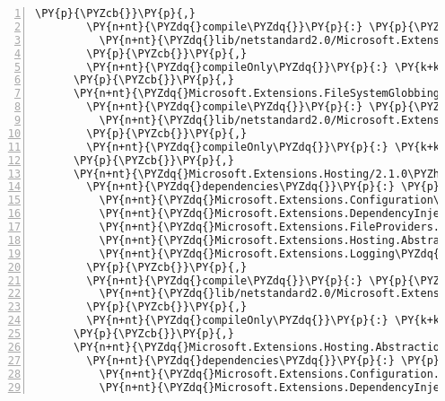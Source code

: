 \begin{Verbatim}[commandchars=\\\{\},numbers=left,firstnumber=1,stepnumber=1,numberblanklines=0]
        \PY{p}{\PYZcb{}}\PY{p}{,}
        \PY{n+nt}{\PYZdq{}compile\PYZdq{}}\PY{p}{:} \PY{p}{\PYZob{}}
          \PY{n+nt}{\PYZdq{}lib/netstandard2.0/Microsoft.Extensions.FileProviders.Physical.dll\PYZdq{}}\PY{p}{:} \PY{p}{\PYZob{}}\PY{p}{\PYZcb{}}
        \PY{p}{\PYZcb{}}\PY{p}{,}
        \PY{n+nt}{\PYZdq{}compileOnly\PYZdq{}}\PY{p}{:} \PY{k+kc}{true}
      \PY{p}{\PYZcb{}}\PY{p}{,}
      \PY{n+nt}{\PYZdq{}Microsoft.Extensions.FileSystemGlobbing/2.1.0\PYZhy{}rc1\PYZhy{}final\PYZdq{}}\PY{p}{:} \PY{p}{\PYZob{}}
        \PY{n+nt}{\PYZdq{}compile\PYZdq{}}\PY{p}{:} \PY{p}{\PYZob{}}
          \PY{n+nt}{\PYZdq{}lib/netstandard2.0/Microsoft.Extensions.FileSystemGlobbing.dll\PYZdq{}}\PY{p}{:} \PY{p}{\PYZob{}}\PY{p}{\PYZcb{}}
        \PY{p}{\PYZcb{}}\PY{p}{,}
        \PY{n+nt}{\PYZdq{}compileOnly\PYZdq{}}\PY{p}{:} \PY{k+kc}{true}
      \PY{p}{\PYZcb{}}\PY{p}{,}
      \PY{n+nt}{\PYZdq{}Microsoft.Extensions.Hosting/2.1.0\PYZhy{}rc1\PYZhy{}final\PYZdq{}}\PY{p}{:} \PY{p}{\PYZob{}}
        \PY{n+nt}{\PYZdq{}dependencies\PYZdq{}}\PY{p}{:} \PY{p}{\PYZob{}}
          \PY{n+nt}{\PYZdq{}Microsoft.Extensions.Configuration\PYZdq{}}\PY{p}{:} \PY{l+s+s2}{\PYZdq{}2.1.0\PYZhy{}rc1\PYZhy{}final\PYZdq{}}\PY{p}{,}
          \PY{n+nt}{\PYZdq{}Microsoft.Extensions.DependencyInjection\PYZdq{}}\PY{p}{:} \PY{l+s+s2}{\PYZdq{}2.1.0\PYZhy{}rc1\PYZhy{}final\PYZdq{}}\PY{p}{,}
          \PY{n+nt}{\PYZdq{}Microsoft.Extensions.FileProviders.Physical\PYZdq{}}\PY{p}{:} \PY{l+s+s2}{\PYZdq{}2.1.0\PYZhy{}rc1\PYZhy{}final\PYZdq{}}\PY{p}{,}
          \PY{n+nt}{\PYZdq{}Microsoft.Extensions.Hosting.Abstractions\PYZdq{}}\PY{p}{:} \PY{l+s+s2}{\PYZdq{}2.1.0\PYZhy{}rc1\PYZhy{}final\PYZdq{}}\PY{p}{,}
          \PY{n+nt}{\PYZdq{}Microsoft.Extensions.Logging\PYZdq{}}\PY{p}{:} \PY{l+s+s2}{\PYZdq{}2.1.0\PYZhy{}rc1\PYZhy{}final\PYZdq{}}
        \PY{p}{\PYZcb{}}\PY{p}{,}
        \PY{n+nt}{\PYZdq{}compile\PYZdq{}}\PY{p}{:} \PY{p}{\PYZob{}}
          \PY{n+nt}{\PYZdq{}lib/netstandard2.0/Microsoft.Extensions.Hosting.dll\PYZdq{}}\PY{p}{:} \PY{p}{\PYZob{}}\PY{p}{\PYZcb{}}
        \PY{p}{\PYZcb{}}\PY{p}{,}
        \PY{n+nt}{\PYZdq{}compileOnly\PYZdq{}}\PY{p}{:} \PY{k+kc}{true}
      \PY{p}{\PYZcb{}}\PY{p}{,}
      \PY{n+nt}{\PYZdq{}Microsoft.Extensions.Hosting.Abstractions/2.1.0\PYZhy{}rc1\PYZhy{}final\PYZdq{}}\PY{p}{:} \PY{p}{\PYZob{}}
        \PY{n+nt}{\PYZdq{}dependencies\PYZdq{}}\PY{p}{:} \PY{p}{\PYZob{}}
          \PY{n+nt}{\PYZdq{}Microsoft.Extensions.Configuration.Abstractions\PYZdq{}}\PY{p}{:} \PY{l+s+s2}{\PYZdq{}2.1.0\PYZhy{}rc1\PYZhy{}final\PYZdq{}}\PY{p}{,}
          \PY{n+nt}{\PYZdq{}Microsoft.Extensions.DependencyInjection.Abstractions\PYZdq{}}\PY{p}{:} \PY{l+s+s2}{\PYZdq{}2.1.0\PYZhy{}rc1\PYZhy{}final\PYZdq{}}\PY{p}{,}

\end{Verbatim}
